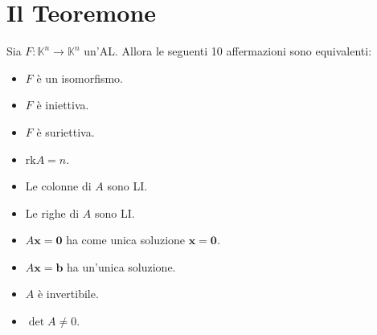 \documentclass[draft]{article}
\newcommand{\bl}[1]{\mathbf{#1}}
\begin{document}
\section{Il Teoremone}
Sia $F:\mathbb{K}^n \rightarrow \mathbb{K}^n$ un'AL. Allora le seguenti 10 affermazioni sono equivalenti:
\begin{itemize}
\item $F$ è un isomorfismo.
\item $F$ è iniettiva.
\item $F$ è suriettiva.
\item $\mathrm{rk}A=n$.
\item Le colonne di $A$ sono LI.
\item Le righe di $A$ sono LI.
\item $A \bl{x}= \bl{0}$ ha come unica soluzione $\bl{x}=\bl{0}$.
\item $A \bl{x}= \bl{b}$ ha un'unica soluzione.
\item $A$ è invertibile.
\item $\det A \neq 0$.
\end{itemize}
\end{document}
